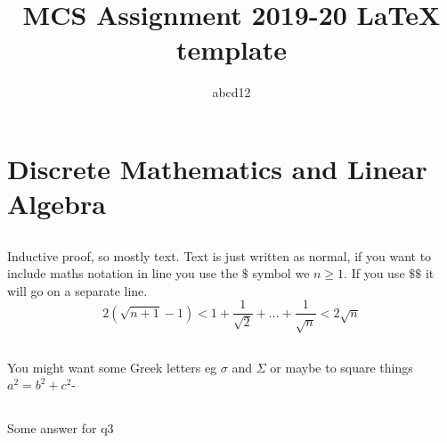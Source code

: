 \documentclass[]{article}
\title{MCS Assignment 2019-20 LaTeX template}
\author{abcd12} %
\begin{document}
\maketitle


\section{Discrete Mathematics and Linear Algebra}
\subsection{}
Inductive proof, so mostly text. Text is just written as normal, if you want to include maths notation in line you use the $\$$ symbol we $n\geq 1$.
If you use $\$\$$ it will go on a separate line. $$2(\sqrt{n+1}-1)<1 + \frac{1}{\sqrt{2}} + ... + \frac{1}{\sqrt{n}} < 2\sqrt{n}$$
\subsection{}
You might want some Greek letters eg $\sigma$ and $\Sigma$ or maybe to square things $a^{2} = b^{2} +c^{2}$-
\subsection{}
Some answer for q3
\end{document}
